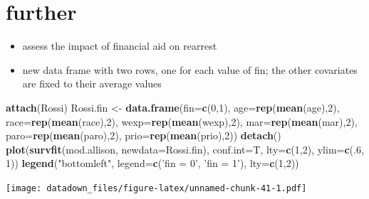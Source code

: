 \documentclass[]{book}
\newenvironment{Shaded}{\begin{snugshade}}{\end{snugshade}}
\newcommand{\DataTypeTok}[1]{\textcolor[rgb]{0.13,0.29,0.53}{#1}}
\newcommand{\DecValTok}[1]{\textcolor[rgb]{0.00,0.00,0.81}{#1}}
\newcommand{\KeywordTok}[1]{\textcolor[rgb]{0.13,0.29,0.53}{\textbf{#1}}}
\newcommand{\NormalTok}[1]{#1}
\newcommand{\StringTok}[1]{\textcolor[rgb]{0.31,0.60,0.02}{#1}}
\providecommand{\tightlist}{%
  \setlength{\itemsep}{0pt}\setlength{\parskip}{0pt}}
\begin{document}
\hypertarget{further}{%
\section{further}\label{further}}

\begin{itemize}
\tightlist
\item
  assess the impact of financial aid on rearrest
\item
  new data frame with two rows, one for each value of fin; the other covariates are fixed to their average values
\end{itemize}

\begin{Shaded}
\begin{Highlighting}[]
\KeywordTok{attach}\NormalTok{(Rossi)}
\NormalTok{Rossi.fin <-}\StringTok{ }\KeywordTok{data.frame}\NormalTok{(}\DataTypeTok{fin=}\KeywordTok{c}\NormalTok{(}\DecValTok{0}\NormalTok{,}\DecValTok{1}\NormalTok{), }\DataTypeTok{age=}\KeywordTok{rep}\NormalTok{(}\KeywordTok{mean}\NormalTok{(age),}\DecValTok{2}\NormalTok{), }\DataTypeTok{race=}\KeywordTok{rep}\NormalTok{(}\KeywordTok{mean}\NormalTok{(race),}\DecValTok{2}\NormalTok{), }\DataTypeTok{wexp=}\KeywordTok{rep}\NormalTok{(}\KeywordTok{mean}\NormalTok{(wexp),}\DecValTok{2}\NormalTok{), }\DataTypeTok{mar=}\KeywordTok{rep}\NormalTok{(}\KeywordTok{mean}\NormalTok{(mar),}\DecValTok{2}\NormalTok{), }\DataTypeTok{paro=}\KeywordTok{rep}\NormalTok{(}\KeywordTok{mean}\NormalTok{(paro),}\DecValTok{2}\NormalTok{), }\DataTypeTok{prio=}\KeywordTok{rep}\NormalTok{(}\KeywordTok{mean}\NormalTok{(prio),}\DecValTok{2}\NormalTok{))}
\KeywordTok{detach}\NormalTok{()}
\KeywordTok{plot}\NormalTok{(}\KeywordTok{survfit}\NormalTok{(mod.allison, }\DataTypeTok{newdata=}\NormalTok{Rossi.fin), }\DataTypeTok{conf.int=}\NormalTok{T, }\DataTypeTok{lty=}\KeywordTok{c}\NormalTok{(}\DecValTok{1}\NormalTok{,}\DecValTok{2}\NormalTok{), }\DataTypeTok{ylim=}\KeywordTok{c}\NormalTok{(.}\DecValTok{6}\NormalTok{, }\DecValTok{1}\NormalTok{))}
\KeywordTok{legend}\NormalTok{(}\StringTok{"bottomleft"}\NormalTok{, }\DataTypeTok{legend=}\KeywordTok{c}\NormalTok{(}\StringTok{'fin = 0'}\NormalTok{, }\StringTok{'fin = 1'}\NormalTok{), }\DataTypeTok{lty=}\KeywordTok{c}\NormalTok{(}\DecValTok{1}\NormalTok{,}\DecValTok{2}\NormalTok{))}
\end{Highlighting}
\end{Shaded}

\texttt{[image: datadown\_files/figure-latex/unnamed-chunk-41-1.pdf]}
\end{document}

